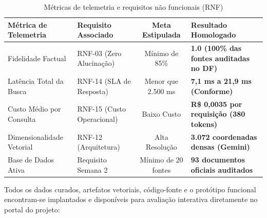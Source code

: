 \documentclass[11pt,a4paper]{article}
\begin{document}
\begin{table}[!htbp]
\centering
\small
\renewcommand{\arraystretch}{1.03}
\caption{Métricas de telemetria e requisitos não funcionais (RNF)}
\begin{tabularx}{\textwidth}{p{4.2cm} p{4.2cm} c X}
\toprule
\textbf{Métrica de Telemetria} & \textbf{Requisito Associado} & \textbf{Meta Estipulada} & \textbf{Resultado Homologado} \\
\midrule
Fidelidade Factual & RNF-03 (Zero Alucinação) & Mínimo de 85\% & \textbf{1.0 (100\% das fontes auditadas no DF)} \\
Latência Total da Busca & RNF-14 (SLA de Resposta) & Menor que 2.500 ms & \textbf{7,1 ms a 21,9 ms (Conforme)} \\
Custo Médio por Consulta & RNF-15 (Custo Operacional) & Baixo Custo & \textbf{R\$ 0,0035 por requisição (380 tokens)} \\
Dimensionalidade Vetorial & RNF-12 (Arquitetura) & Alta Resolução & \textbf{3.072 coordenadas densas (Gemini)} \\
Base de Dados Ativa & Requisito Semana 2 & Mínimo de 20 fontes & \textbf{93 documentos oficiais auditados} \\
\bottomrule
\end{tabularx}
\vspace{0.1cm}
\end{table}

Todos os dados curados, artefatos vetoriais, código-fonte e o protótipo funcional encontram-se implantados e disponíveis para avaliação interativa diretamente no portal do projeto:

\begin{center}
\end{center}
\end{document}
